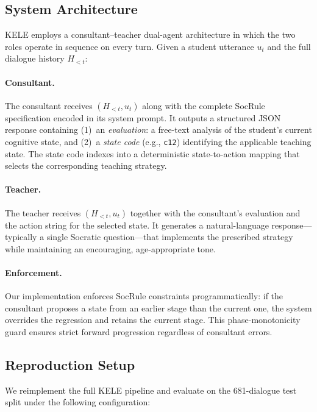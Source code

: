 \documentclass[11pt]{article}
\begin{document}
\subsection{System Architecture}
\label{sec:architecture}

KELE employs a consultant--teacher dual-agent architecture in which the two roles operate in sequence on every turn. Given a student utterance $u_t$ and the full dialogue history $H_{<t}$:

\paragraph{Consultant.} The consultant receives $(H_{<t}, u_t)$ along with the complete SocRule specification encoded in its system prompt. It outputs a structured JSON response containing (1)~an \emph{evaluation}: a free-text analysis of the student's current cognitive state, and (2)~a \emph{state code} (e.g., \texttt{c12}) identifying the applicable teaching state. The state code indexes into a deterministic state-to-action mapping that selects the corresponding teaching strategy.

\paragraph{Teacher.} The teacher receives $(H_{<t}, u_t)$ together with the consultant's evaluation and the action string for the selected state. It generates a natural-language response---typically a single Socratic question---that implements the prescribed strategy while maintaining an encouraging, age-appropriate tone.

\paragraph{Enforcement.} Our implementation enforces SocRule constraints programmatically: if the consultant proposes a state from an earlier stage than the current one, the system overrides the regression and retains the current stage. This phase-monotonicity guard ensures strict forward progression regardless of consultant errors.

\subsection{Reproduction Setup}

We reimplement the full KELE pipeline and evaluate on the 681-dialogue test split under the following configuration:
\end{document}
